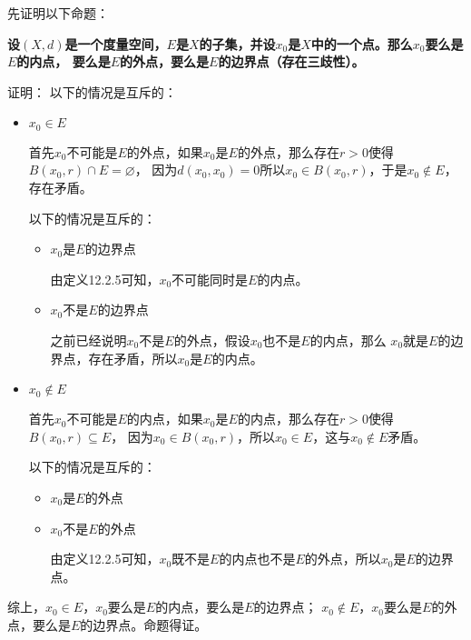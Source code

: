 \documentclass{article}
\begin{document}
\begin{zremark}
      先证明以下命题：

      \textbf{设$(X, d)$是一个度量空间，$E$是$X$的子集，并设$x_0$是$X$中的一个点。那么$x_0$要么是$E$的内点，
            要么是$E$的外点，要么是$E$的边界点（存在三歧性）。}


      证明：
      以下的情况是互斥的：
      \begin{itemize}
            \item $x_0 \in E$

                  首先$x_0$不可能是$E$的外点，如果$x_0$是$E$的外点，那么存在$r > 0$使得$B(x_0, r) \cap E = \varnothing$，
                  因为$d(x_0, x_0) = 0$所以$x_0 \in B(x_0, r)$，于是$x_0 \notin E$，存在矛盾。

                  以下的情况是互斥的：
                  \begin{itemize}
                        \item $x_0$是$E$的边界点

                              由定义12.2.5可知，$x_0$不可能同时是$E$的内点。

                        \item $x_0$不是$E$的边界点

                              之前已经说明$x_0$不是$E$的外点，假设$x_0$也不是$E$的内点，那么
                              $x_0$就是$E$的边界点，存在矛盾，所以$x_0$是$E$的内点。

                  \end{itemize}
            \item $x_0 \notin E$

                  首先$x_0$不可能是$E$的内点，如果$x_0$是$E$的内点，那么存在$r > 0$使得$B(x_0, r) \subseteq E$，
                  因为$x_0 \in B(x_0, r)$，所以$x_0 \in E$，这与$x_0 \notin E$矛盾。

                  以下的情况是互斥的：
                  \begin{itemize}
                        \item $x_0$是$E$的外点

                        \item $x_0$不是$E$的外点

                              由定义12.2.5可知，$x_0$既不是$E$的内点也不是$E$的外点，所以$x_0$是$E$的边界点。
                  \end{itemize}
      \end{itemize}

      综上，$x_0 \in E$，$x_0$要么是$E$的内点，要么是$E$的边界点；
      $x_0 \notin E$，$x_0$要么是$E$的外点，要么是$E$的边界点。命题得证。


\end{zremark}
\end{document}
